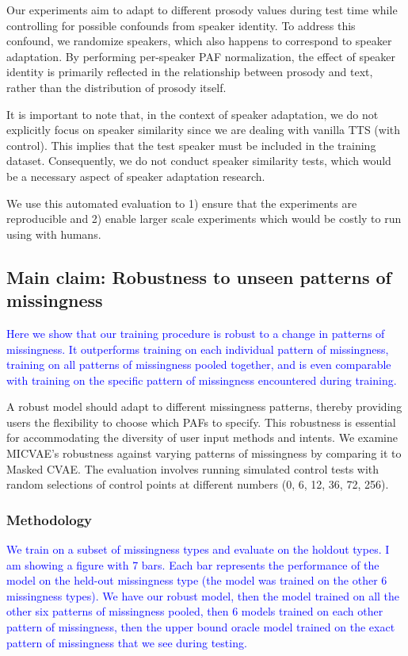 \documentclass[a4paper,12pt,twoside,openright]{article}
\newcommand{\draft}[1]{\textcolor{blue}{#1}}
\begin{document}
Our experiments aim to adapt to different prosody values during test time while controlling for possible confounds from speaker identity. To address this confound, we randomize speakers, which also happens to correspond to speaker adaptation. By performing per-speaker PAF normalization, the effect of speaker identity is primarily reflected in the relationship between prosody and text, rather than the distribution of prosody itself.

It is important to note that, in the context of speaker adaptation, we do not explicitly focus on speaker similarity since we are dealing with vanilla TTS (with control). This implies that the test speaker must be included in the training dataset. Consequently, we do not conduct speaker similarity tests, which would be a necessary aspect of speaker adaptation research.

We use this automated evaluation to 1) ensure that the experiments are reproducible and 2) enable larger scale experiments which would be costly to run using with humans.

\subsection{Main claim: Robustness to unseen patterns of missingness}

\draft{Here we show that our training procedure is robust to a change in patterns of missingness. It outperforms training on each individual pattern of missingness, training on all patterns of missingness pooled together, and is even comparable with training on the specific pattern of missingness encountered during training.}

A robust model should adapt to different missingness patterns, thereby providing users the flexibility to choose which PAFs to specify. This robustness is essential for accommodating the diversity of user input methods and intents. We examine MICVAE's robustness against varying patterns of missingness by comparing it to Masked CVAE. The evaluation involves running simulated control tests with random selections of control points at different numbers (0, 6, 12, 36, 72, 256).

\subsubsection{Methodology}

\draft{We train on a subset of missingness types and evaluate on the holdout types. I am showing a figure with 7 bars. Each bar represents the performance of the model on the held-out missingness type (the model was trained on the other 6 missingness types). We have our robust model, then the model trained on all the other six patterns of missingness pooled, then 6 models trained on each other pattern of missingness, then the upper bound oracle model trained on the exact pattern of missingness that we see during testing.}
\end{document}
